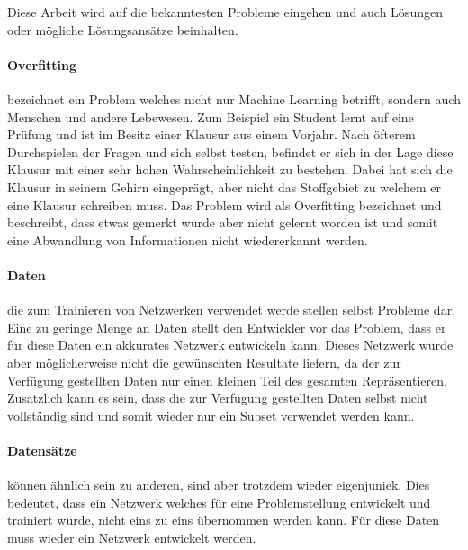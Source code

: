 \noindent
Diese Arbeit wird auf die bekanntesten Probleme eingehen und auch Lösungen oder mögliche Lösungsansätze beinhalten. 


\paragraph{Overfitting} bezeichnet ein Problem welches nicht nur Machine Learning betrifft, sondern auch Menschen und andere Lebewesen. 
Zum Beispiel ein Student lernt auf eine Prüfung und ist im Besitz einer Klausur aus einem Vorjahr. 
Nach öfterem Durchspielen der Fragen und sich selbst testen, befindet er sich in der Lage diese Klausur mit einer sehr hohen Wahrscheinlichkeit zu bestehen. 
Dabei hat sich die Klausur in seinem Gehirn eingeprägt, aber nicht das Stoffgebiet zu welchem er eine Klausur schreiben muss. 
Das Problem wird als Overfitting bezeichnet und beschreibt, dass etwas gemerkt wurde aber nicht gelernt worden ist und somit eine Abwandlung von Informationen nicht wiedererkannt werden.


\paragraph{Daten} die zum Trainieren von Netzwerken verwendet werde stellen selbst Probleme dar.%
Eine zu geringe Menge an Daten stellt den Entwickler vor das Problem, dass er für diese Daten ein akkurates Netzwerk entwickeln kann.
Dieses Netzwerk würde aber möglicherweise nicht die gewünschten Resultate liefern, da der zur Verfügung gestellten Daten nur einen kleinen Teil des gesamten Repräsentieren.
Zusätzlich kann es sein, dass die zur Verfügung gestellten Daten selbst nicht vollständig sind und somit wieder nur ein Subset verwendet werden kann.

\paragraph{Datensätze} können ähnlich sein zu anderen, sind aber trotzdem wieder eigen\/juniek.
Dies bedeutet, dass ein Netzwerk welches für eine Problemstellung entwickelt und trainiert wurde, nicht eins zu eins übernommen werden kann.
Für diese Daten muss wieder ein Netzwerk entwickelt werden.

